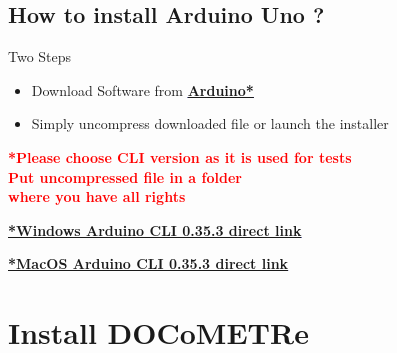 \documentclass[a4paper,11pt]{beamer}
\begin{document}
\subsection{How to install Arduino Uno ?}
\begin{frame}[containsverbatim]

\begin{block}{Two Steps}
    \begin{itemize}
        \item Download Software from \textcolor{blue}{\textbf{\underline{\href{https://www.arduino.cc/en/software}{Arduino*}}}}
        \item Simply uncompress downloaded file or launch the installer
    \end{itemize}
\end{block}

\begin{alertblock}{}
    \centering
    \textcolor{red}{\textbf{*Please choose CLI version as it is used for tests}}\\
    \textcolor{red}{\textbf{Put uncompressed file in a folder}}\\
    \textcolor{red}{\textbf{where you have all rights}}
\end{alertblock}
\centering

\textcolor{blue}{\textbf{\underline{\href{https://github.com/arduino/arduino-cli/releases/download/v0.35.3/arduino-cli_0.35.3_Windows_32bit.zip}{*Windows Arduino CLI 0.35.3 direct link}}}}

\textcolor{blue}{\textbf{\underline{\href{https://github.com/arduino/arduino-cli/releases/download/v0.35.3/arduino-cli_0.35.3_macOS_64bit.tar.gz}{*MacOS Arduino CLI 0.35.3 direct link}}}}



\end{frame}

\section{Install DOCoMETRe}
\end{document}
